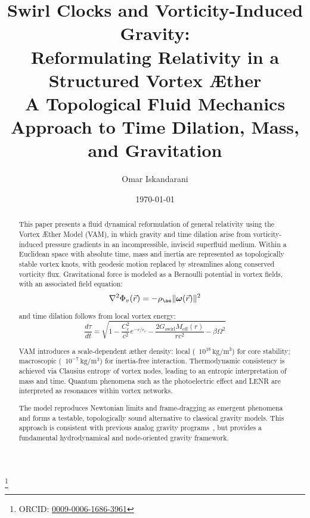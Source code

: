 \documentclass[a4paper, aps,preprint,superscriptaddress, 12pt]{revtex4}
\begin{document}
\author{Omar Iskandarani}
\title{
    Swirl Clocks and Vorticity-Induced Gravity:\\
    Reformulating Relativity in a Structured Vortex Æther\\
    \textnormal{\normalsize A Topological Fluid Mechanics Approach to Time Dilation, Mass, and Gravitation}
}

\date{\today}
\thanks{ORCID: \href{https://orcid.org/0009-0006-1686-3961}{0009-0006-1686-3961}}


\begin{abstract}
    This paper presents a fluid dynamical reformulation of general relativity using the Vortex Æther Model (VAM), in which gravity and time dilation arise from vorticity-induced pressure gradients in an incompressible, inviscid superfluid medium. Within a Euclidean space with absolute time, mass and inertia are represented as topologically stable vortex knots, with geodesic motion replaced by streamlines along conserved vorticity flux. Gravitational force is modeled as a Bernoulli potential in vortex fields, with an associated field equation:
    \begin{equation*}
        \nabla^2 \Phi_v(\vec{r}) = -\rho_{\ae} \|\boldsymbol{\omega}(\vec{r})\|^2
    \end{equation*}

    and time dilation follows from local vortex energy:
    \begin{equation*}
        \frac{d\tau}{dt} = \sqrt{1 - \frac{C_e^2}{c^2} e^{-r/r_c} - \frac{2G_{\text{swirl}} M_{\text{eff}}(r)}{rc^2} - \beta \Omega^2}
    \end{equation*}

    VAM introduces a scale-dependent æther density: local (~$10^{18}\,\mathrm{kg/m^3}$) for core stability; macroscopic (~$10^{-7}\,\mathrm{kg/m^3}$) for inertia-free interaction. Thermodynamic consistency is achieved via Clausius entropy of vortex nodes, leading to an entropic interpretation of mass and time. Quantum phenomena such as the photoelectric effect and LENR are interpreted as resonances within vortex networks.

    The model reproduces Newtonian limits and frame-dragging as emergent phenomena and forms a testable, topologically sound alternative to classical gravity models. This approach is consistent with previous analog gravity programs~\cite{barcelo2011analogue,volovik2009universe}, but provides a fundamental hydrodynamical and node-oriented gravity framework.
\end{abstract}
\end{document}
